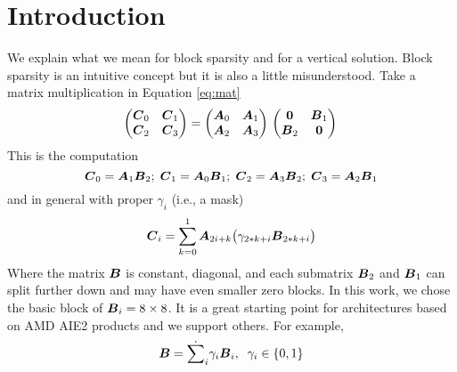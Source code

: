 \documentclass[sigconf]{acmart}
\begin{document}
\maketitle


\section{Introduction}
\label{sec:introduction}

We explain what we mean for block sparsity and for a vertical
solution. Block sparsity is an intuitive concept but it is also a
little misunderstood. Take a matrix multiplication in Equation
\ref{eq:mat}
\begin{equation}
  \label{eq:mat}
  \begin{pmatrix}
    {\boldsymbol C}_0 & {\boldsymbol C}_1 \\
    {\boldsymbol C}_2 & {\boldsymbol C}_3 \\ 
  \end{pmatrix} = 
  \begin{pmatrix}
    {\boldsymbol A}_0 & {\boldsymbol A}_1 \\
    {\boldsymbol A}_2 & {\boldsymbol A}_3 \\ 
  \end{pmatrix}\\
  \begin{pmatrix}
    {\boldsymbol 0}   & {\boldsymbol B}_1 \\
    {\boldsymbol B}_2 & {\boldsymbol 0} \\ 
  \end{pmatrix}\\
\end{equation}
This is the computation {\small \begin{equation} {\boldsymbol C}_0 = {\boldsymbol A}_{1}
    {\boldsymbol B}_{2}; \; {\boldsymbol C}_1 = {\boldsymbol A}_{0} {\boldsymbol B}_{1}; \; {\boldsymbol C}_2 =
    {\boldsymbol A}_{3} {\boldsymbol B}_{2}; \; {\boldsymbol C}_3 = {\boldsymbol A}_{2} {\boldsymbol B}_{1}
\end{equation}}
and in general with proper $\gamma_i$ (i.e., a mask)
\begin{equation}
  {\boldsymbol C}_i = \sum_{k=0}^1 {\boldsymbol A}_{2i+ k} \big(\gamma_{2*k+i} {\boldsymbol B}_{2*k+i}\big)
\end{equation}
Where the matrix ${\boldsymbol B}$ is constant, diagonal, and each submatrix
${\boldsymbol B_2}$ and ${\boldsymbol B}_1$ can split further down and may have even
smaller zero blocks. In this work, we chose the basic block of
${\boldsymbol B}_i = 8\times 8$. It is a great starting point for architectures
based on AMD AIE2 products and we support others.  For example,
\begin{equation}
  {\boldsymbol B} = \dot{\sum}_i \gamma_i {\boldsymbol B}_i, \;\; \gamma_i \in \{0,1\} 
\end{equation}
\end{document}
